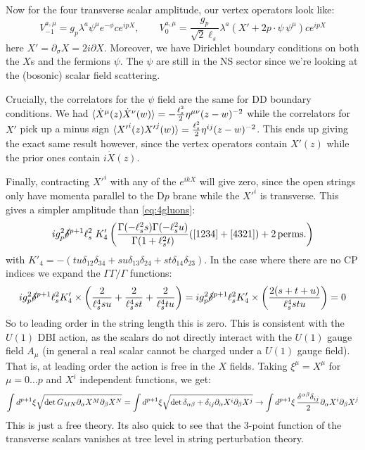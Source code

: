 \documentclass[11pt, class=article, crop=false]{standalone}
\begin{document}
\begin{enumerate}
	Now for the four transverse scalar amplitude, our vertex operators look like:
	\[
		V_{-1}^{a, \mu} = g_p \lambda^a \psi^\mu e^{-\phi} c e^{i p X}, \qquad
		V_{0}^{a, \mu} = \frac{g_p}{\sqrt 2 \ell_s} \lambda^a (X' + 2 p \cdot \psi \, \psi^\mu) c e^{i p X}
	\]
	here $X' = \partial_\sigma X =  2 i \partial X$. Moreover, we have Dirichlet boundary conditions on both the $X$s and the fermions $\psi$. The $\psi$ are still in the NS sector since we're looking at the (bosonic) scalar field scattering. 
	
	Crucially, the correlators for the $\psi$ field are the same for DD boundary conditions. We had $\braket{\dot X^\mu(z) \dot X^\nu(w)} = -\tfrac{\ell_s^2}{2} \eta^{\mu \nu} (z-w)^{-2}$ while the correlators for $X'$ pick up a minus sign $\braket{{X'}^i (z) {X'}^j(w)} = \tfrac{\ell_s^2}{2} \eta^{ij} (z-w)^{-2}$. This ends up giving the exact same result however, since the vertex operators contain $X'(z)$ while the prior ones contain $i \dot X(z)$. 
	
	Finally, contracting ${X'}^i$ with any of the $e^{i k X}$ will give zero, since the open strings only have momenta parallel to the D$p$ brane while the ${X'}^i$ is transverse. This gives a simpler amplitude than \eqref{eq:4gluons}:
	\begin{equation}\label{eq:4scalars}
		i g_p^2 \cancel\delta^{p+1} \ell_s^2 \; K_4'  \left( \frac{\Gamma(-\ell_s^2 s) \Gamma( -\ell_s^2 u)}{\Gamma(1 + \ell_s^2 t)} ([1234] + [4321]) + 2 \,\mathrm{perms.}\right)
	\end{equation}
	with $K'_4 = - (t u  \delta_{12} \delta_{34} + s u \delta_{13} \delta_{24} + s t \delta_{14} \delta_{23})$.
	In the case where there are no CP indices we expand the $\Gamma \Gamma/\Gamma$ functions:
	\[
		i g_p^2 \cancel\delta^{p+1} \ell_s^2 K'_4 \times \left(\frac{2}{\ell_s^4 su} + \frac{2}{\ell_s^4 st} + \frac{2}{\ell_s^4 tu}\right) = i g_p^2 \cancel\delta^{p+1} \ell_s^2 K'_4 \times \left( \frac{2(s+t+u)}{\ell_s^4 stu}\right)  = 0
	\]
	So to leading order in the string length this is zero. This is consistent with the $U(1)$ DBI action, as the scalars do not directly interact with the $U(1)$ gauge field $A_\mu$ (in general a real scalar cannot be charged under a $U(1)$ gauge field). That is, at leading order the action is free in the $X$ fields. Taking $\xi^\mu = X^\mu$ for $\mu = 0 \dots p$ and $X^i$ independent functions, we get: 
	\[
		 \int d^{p+1} \xi \sqrt{\det{G_{MN} \partial_\alpha X^M \partial_\beta X^N}} = \int d^{p+1} \xi \sqrt{\det \delta_{\alpha \beta} + \delta_{ij} \partial_\alpha X^i \partial_\beta X^j} \to \int d^{p+1} \xi\, \frac{\delta^{\alpha \beta}\delta_{ij}}{2} \partial_\alpha X^i \partial_\beta X^j 
	\]
	This is just a free theory. Its also quick to see that the 3-point function of the transverse scalars vanishes at tree level in string perturbation theory. 


\end{enumerate}
\end{document}
